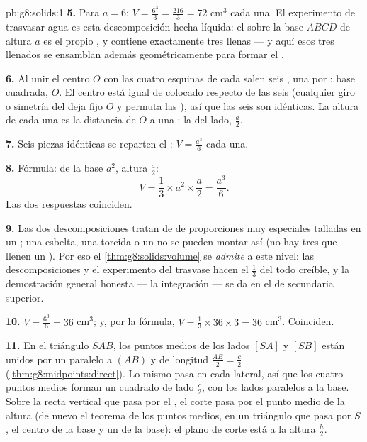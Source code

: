 \begin{solution}{pb:g8:solids:1}
\textbf{5.} Para $a = 6$:
$V = \frac{6^3}{3} = \frac{216}{3} = 72$ cm$^3$ cada una. El
experimento de trasvasar agua es esta descomposición hecha líquida: el
 sobre la base $ABCD$ de altura $a$ es el propio ,
y contiene exactamente tres  llenas --- y aquí esos tres llenados
se ensamblan además geométricamente para formar el .

\textbf{6.} Al unir el centro $O$ con las cuatro esquinas de cada
 salen seis , una por : base cuadrada,  $O$.
El centro está igual de colocado respecto de las seis  (cualquier
giro o simetría del  deja fijo $O$ y permuta las
), así que las seis  son idénticas. La altura de cada una es
la distancia de $O$ a una : la  del lado, $\frac{a}{2}$.

\textbf{7.} Seis piezas idénticas se reparten el :
$V = \frac{a^3}{6}$ cada una.

\textbf{8.} Fórmula:  de la base $a^2$, altura $\frac a2$:
\[
V = \frac13 \times a^2 \times \frac{a}{2} = \frac{a^3}{6} .
\]
Las dos respuestas coinciden.

\textbf{9.} Las dos descomposiciones tratan de  de proporciones
muy especiales talladas en un ; una  esbelta, una torcida
o un  no se pueden montar así (no hay tres  que llenen
un ). Por eso el \cref{thm:g8:solids:volume} se
\emph{admite} a este nivel: las descomposiciones y el
experimento del trasvase hacen el $\frac13$ del todo creíble,
y la demostración general honesta --- la integración --- se da en el
 de secundaria superior.

\textbf{10.} $V = \frac{6^3}{6} = 36$ cm$^3$; y, por la fórmula,
$V = \frac13 \times 36 \times 3 = 36$ cm$^3$. Coinciden.

\textbf{11.} En el triángulo $SAB$, los puntos medios de los lados
$[SA]$ y $[SB]$ están unidos por un  paralelo a $(AB)$ y
de longitud $\frac{AB}{2} = \frac{c}{2}$
(\cref{thm:g8:midpoints:direct}). Lo mismo pasa en cada 
lateral, así que los cuatro puntos medios forman un cuadrado de lado $\frac c2$,
con los lados paralelos a la base. Sobre la recta vertical que pasa por
el , el corte pasa por el punto medio de la altura (de nuevo el teorema
de los puntos medios, en un triángulo que pasa por $S$, el centro de la base y un
 de la base): el plano de corte está a la altura $\frac h2$.


\end{solution}
